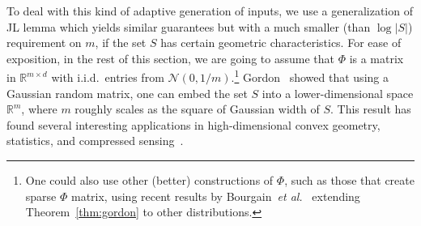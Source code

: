 \documentclass{article}
\theoremstyle{plain}
\def \NNN {\mathcal{N}}
\def \R {\mathbb{R}}
\begin{document}
To deal with this kind of adaptive generation of inputs, we use a generalization of JL lemma which yields similar guarantees but with a much smaller (than $\log |S|$) requirement on $m$, if the set $S$ has certain geometric characteristics. For ease of exposition, in the rest of this section, we are going to assume that $\Phi$ is a matrix in $\R^{m \times d}$ with i.i.d.\ entries from $\NNN(0,1/m)$.\footnote{One could also use other (better) constructions of $\Phi$, such as those that create sparse $\Phi$ matrix, using recent results by Bourgain~\emph{et al.}\ \cite{bourgain2015toward} extending Theorem~\ref{thm:gordon} to other distributions.} Gordon~\cite{gordon1988milman} showed that using a Gaussian random matrix, one can embed the set $S$ into a lower-dimensional space $\R^m$, where $m$ roughly scales as the square of Gaussian width of $S$. This result has found several interesting applications in high-dimensional convex geometry, statistics, and compressed sensing~\cite{pfandersampling}.
\end{document}
